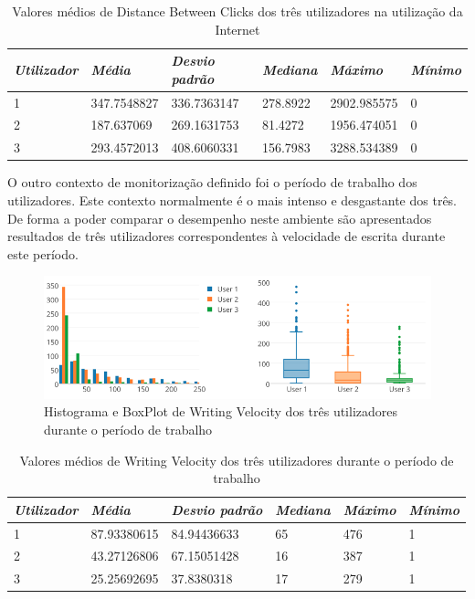 {\renewcommand{\arraystretch}{1.6}
\begin{table}[!htb]
\centering
\label{tab:a_tbk}
\vspace{2pt}
\begin{tabular}{ | l | l | l | l | l | l |  }
\hline
\textit{Utilizador}&\textit{Média}&\textit{Desvio padrão}&\textit{Mediana} & \textit{Máximo} & \textit{Mínimo}\\  
\hline
1&347.7548827&336.7363147&278.8922&2902.985575&0 \\
2&187.637069&269.1631753&81.4272&1956.474051&0 \\
3&293.4572013&408.6060331&156.7983&3288.534389&0 \\
\hline
\end{tabular}
\caption{Valores médios de Distance Between Clicks dos três utilizadores na utilização da Internet} 
\end{table}}


O outro contexto de monitorização definido foi o período de trabalho dos utilizadores. Este contexto normalmente é o mais intenso e desgastante dos três. De forma a poder comparar o desempenho neste ambiente são apresentados resultados de três utilizadores correspondentes à velocidade de escrita durante este período. 


 \begin{figure}[htb]
   \centering
   \includegraphics[scale=0.45]{Images/writingvelocitywork.png}
   \caption{Histograma e BoxPlot de Writing Velocity dos três utilizadores durante o período de trabalho}
\end{figure}

{\renewcommand{\arraystretch}{1.6}
\begin{table}[!htb]
\centering
\label{tab:a_tbk}
\vspace{2pt}
\begin{tabular}{ | l | l | l | l | l | l |  }
\hline
\textit{Utilizador}&\textit{Média}&\textit{Desvio padrão}&\textit{Mediana} & \textit{Máximo} & \textit{Mínimo}\\  
\hline
1&87.93380615&84.94436633&65&476&1 \\
2&43.27126806&67.15051428&16&387&1 \\
3&25.25692695&37.8380318&17&279&1 \\
\hline
\end{tabular}
\caption{Valores médios de Writing Velocity dos três utilizadores durante o período de trabalho} 
\end{table}}

